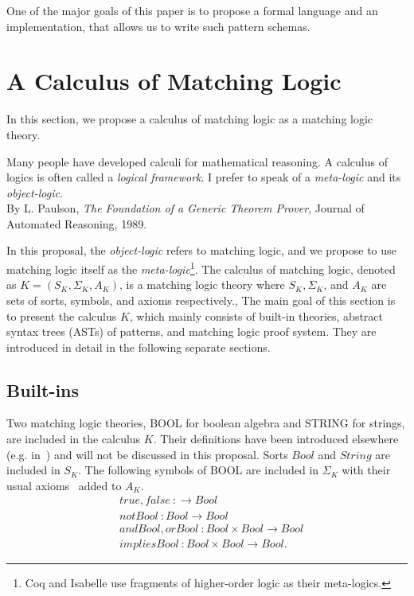 \documentclass[UTF8]{article}
\theoremstyle{plain}
\theoremstyle{definition}
\theoremstyle{remark}
\begin{document}
One of the major goals of this paper is to propose a formal language
and an implementation, that allows us to write such pattern schemas.

\section{A Calculus of Matching Logic}
In this section, we propose a calculus of matching logic as a matching logic 
theory. 
\begin{displayquote}
	Many people have developed calculi for mathematical reasoning. 
	A calculus of logics is often called a \emph{logical framework}.
	I prefer to speak of a \emph{meta-logic} and its \emph{object-logic}. \\
	By L. Paulson, \textit{The Foundation of a Generic Theorem Prover},
	Journal of Automated Reasoning, 1989.
\end{displayquote}
In this proposal, the \emph{object-logic} refers to matching logic,
and we propose to use matching logic itself as the 
\emph{meta-logic}\footnote{Coq and Isabelle use 
fragments of higher-order logic as their meta-logics.}. 
The calculus of matching logic, denoted as $K = (S_K, \Sigma_K, A_K)$, is 
a matching logic theory
where $S_K, \Sigma_K$, and $A_K$ are sets of sorts, symbols, and axioms respectively.,
The main goal of this section is to present the calculus $K$, which mainly 
consists of built-in theories, abstract syntax trees (ASTs) of patterns, and 
matching logic proof system. 
They are introduced in detail in the following separate sections.
\subsection{Built-ins}
Two matching logic theories, {\small BOOL} for boolean algebra and {\small 
STRING} for strings, are included in the calculus $K$. 
Their definitions have been introduced elsewhere (e.g. in~\cite{???}) and will not be discussed in this proposal. 
Sorts $\mathit{Bool}$ and $\mathit{String}$ are included in $S_K$. The following symbols of {\small BOOL} are included in $\Sigma_K$ with their usual axioms~\cite{?} added to $A_K$.
\begin{align*}
&\mathit{true}, \mathit{false} \ \colon \to \mathit{Bool} \\
&\mathit{notBool} \ \colon \mathit{Bool} \to \mathit{Bool} \\
&\mathit{andBool}, \mathit{orBool} \ \colon \mathit{Bool} \times 
\mathit{Bool} \to \mathit{Bool}\\
&\mathit{impliesBool} \ \colon \mathit{Bool} \times \mathit{Bool} \to 
\mathit{Bool}.
\end{align*}
\end{document}
